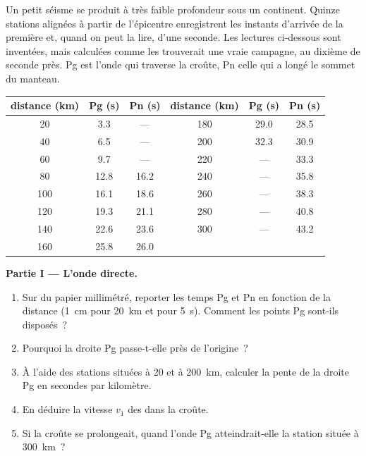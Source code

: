 \begin{problem}
\label{pb:g11:seismic-structure:1}
Un petit séisme se produit à très faible profondeur sous un continent.
Quinze stations alignées à partir de l'épicentre enregistrent les instants
d'arrivée de la première  et, quand on peut la lire, d'une seconde.
Les lectures ci-dessous sont inventées, mais calculées comme les trouverait
une vraie campagne, au dixième de seconde près. Pg est l'onde qui traverse
la croûte, Pn celle qui a longé le sommet du manteau.

\begin{center}
\small
\begin{tabular}{|c|c|c||c|c|c|}
\hline
distance (\unit{km}) & Pg (\unit{s}) & Pn (\unit{s}) & distance (\unit{km}) & Pg (\unit{s}) & Pn (\unit{s}) \\ \hline
20 & 3.3 & --- & 180 & 29.0 & 28.5 \\ \hline
40 & 6.5 & --- & 200 & 32.3 & 30.9 \\ \hline
60 & 9.7 & --- & 220 & --- & 33.3 \\ \hline
80 & 12.8 & 16.2 & 240 & --- & 35.8 \\ \hline
100 & 16.1 & 18.6 & 260 & --- & 38.3 \\ \hline
120 & 19.3 & 21.1 & 280 & --- & 40.8 \\ \hline
140 & 22.6 & 23.6 & 300 & --- & 43.2 \\ \hline
160 & 25.8 & 26.0 & & & \\ \hline
\end{tabular}
\end{center}

\medskip
\noindent\textbf{Partie I --- L'onde directe.}
\begin{enumerate}
  \item Sur du papier millimétré, reporter les temps Pg et Pn en fonction
        de la distance (\qty{1}{cm} pour \qty{20}{km} et pour \qty{5}{s}).
        Comment les points Pg sont-ils disposés~?
  \item Pourquoi la droite Pg passe-t-elle près de l'origine~?
  \item À l'aide des stations situées à 20 et à \qty{200}{km}, calculer la
        pente de la droite Pg en secondes par kilomètre.
  \item En déduire la vitesse $v_1$ des  dans la croûte.
  \item Si la croûte se prolongeait, quand l'onde Pg atteindrait-elle la
        station située à \qty{300}{km}~?
\end{enumerate}


\end{problem}
